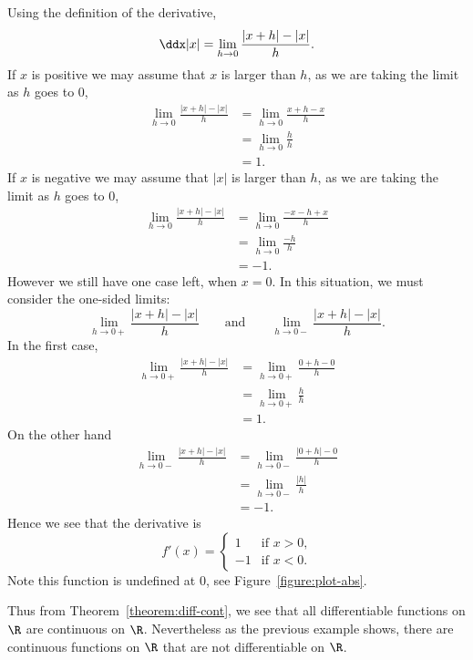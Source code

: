 \begin{solution}
Using the definition of the derivative,
\[
\ddx |x| = \lim_{h\to0}\frac{|x+h| -|x|}{h}.
\]
If $x$ is positive we may assume that $x$ is larger than $h$, as we are
taking the limit as $h$ goes to $0$,
\begin{align*}
\lim_{h\to0}\frac{|x+h| -|x|}{h} &= \lim_{h\to0}\frac{x+h -x}{h}\\
&= \lim_{h\to0}\frac{h}{h}\\
&= 1.
\end{align*}
If $x$ is negative we may assume that $|x|$ is larger than $h$, as we are taking
the limit as $h$ goes to $0$,
\begin{align*}
\lim_{h\to0}\frac{|x+h| -|x|}{h} &= \lim_{h\to0}\frac{-x-h +x}{h}\\
&= \lim_{h\to0}\frac{-h}{h}\\
&= -1.
\end{align*}
However we still have one case left, when $x=0$. In this situation, we
must consider the one-sided limits:
\[
\lim_{h\to0+}\frac{|x+h| -|x|}{h}\qquad\text{and}\qquad \lim_{h\to0-}\frac{|x+h| -|x|}{h}.
\]
In the first case, 
\begin{align*}
\lim_{h\to0+}\frac{|x+h| -|x|}{h} &= \lim_{h\to 0+}\frac{0+h - 0}{h}\\
&= \lim_{h\to 0+}\frac{h}{h}\\
&=1.
\end{align*}
On the other hand
\begin{align*}
\lim_{h\to0-}\frac{|x+h| -|x|}{h} &= \lim_{h\to 0-}\frac{|0+h| - 0}{h}\\
&= \lim_{h\to 0-}\frac{|h|}{h}\\
&=-1.
\end{align*}
Hence we see that the derivative is
\[
f'(x) = 
\begin{cases}
1 &\text{if $x>0$,}\\
-1 &\text{if $x<0$.}
\end{cases}
\]
Note this function is undefined at $0$, see Figure~\ref{figure:plot-abs}. 
\end{solution}


Thus from Theorem~\ref{theorem:diff-cont}, we see that all
differentiable functions on $\R$ are continuous on $\R$. Nevertheless
as the previous example shows, there are continuous functions on $\R$
that are not differentiable on $\R$.




